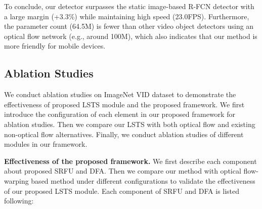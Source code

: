 \documentclass[runningheads]{llncs}
\begin{document}
To conclude, our detector surpasses the static image-based R-FCN detector with a large margin (+3.3\%) while maintaining high speed (23.0FPS). Furthermore, the parameter count (64.5M) is fewer than other video object detectors using an optical flow network (e.g., around 100M), which also indicates that our method is more friendly for mobile devices.


\subsection{Ablation Studies}
We conduct ablation studies on ImageNet VID dataset to demonstrate the effectiveness of proposed LSTS module and the proposed framework. We first introduce the configuration of each element in our proposed framework for ablation studies. Then we compare our LSTS with both optical flow and existing non-optical flow alternatives. Finally, we conduct ablation studies of different modules in our framework.


\noindent \textbf{Effectiveness of the proposed framework.} 
We first describe each component about proposed SRFU and DFA. Then we compare our method with optical flow-warping based method under different configurations to validate the effectiveness of our proposed LSTS module. Each component of SRFU and DFA is listed following:
\end{document}
